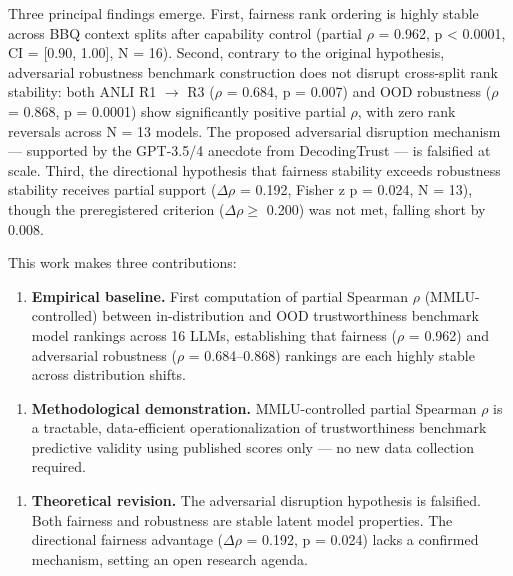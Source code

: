 Three principal findings emerge. First, fairness rank ordering is highly stable across BBQ context splits after capability control (partial $\rho$ = 0.962, p < 0.0001, CI = [0.90, 1.00], N = 16). Second, contrary to the original hypothesis, adversarial robustness benchmark construction does not disrupt cross-split rank stability: both ANLI R1 $\rightarrow$ R3 ($\rho$ = 0.684, p = 0.007) and OOD robustness ($\rho$ = 0.868, p = 0.0001) show significantly positive partial $\rho$, with zero rank reversals across N = 13 models. The proposed adversarial disruption mechanism --- supported by the GPT-3.5/4 anecdote from DecodingTrust --- is falsified at scale. Third, the directional hypothesis that fairness stability exceeds robustness stability receives partial support ($\Delta\rho$ = 0.192, Fisher z p = 0.024, N = 13), though the preregistered criterion ($\Delta\rho \geq$ 0.200) was not met, falling short by 0.008.

This work makes three contributions:

\begin{enumerate}
\item \textbf{Empirical baseline.} First computation of partial Spearman $\rho$ (MMLU-controlled) between in-distribution and OOD trustworthiness benchmark model rankings across 16 LLMs, establishing that fairness ($\rho$ = 0.962) and adversarial robustness ($\rho$ = 0.684--0.868) rankings are each highly stable across distribution shifts.
\end{enumerate}

\begin{enumerate}
\item \textbf{Methodological demonstration.} MMLU-controlled partial Spearman $\rho$ is a tractable, data-efficient operationalization of trustworthiness benchmark predictive validity using published scores only --- no new data collection required.
\end{enumerate}

\begin{enumerate}
\item \textbf{Theoretical revision.} The adversarial disruption hypothesis is falsified. Both fairness and robustness are stable latent model properties. The directional fairness advantage ($\Delta\rho$ = 0.192, p = 0.024) lacks a confirmed mechanism, setting an open research agenda.
\end{enumerate}

